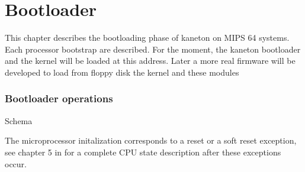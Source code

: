 %
%
%
%
%
%

%
%

\chapter{Bootloader}

This chapter describes the bootloading phase of kaneton on MIPS 64 systems. Each processor bootstrap are described. For the moment, the kaneton bootloader and the kernel will be loaded at this address. Later a more real firmware will be developed to load from floppy disk the kernel and these modules

\subsection{Bootloader operations}

Schema


The microprocessor initalization corresponds to a reset or a soft reset exception, see chapter 5 in \cite{MIPS64:MIPS64V3} for a complete CPU state description after these exceptions occur.
